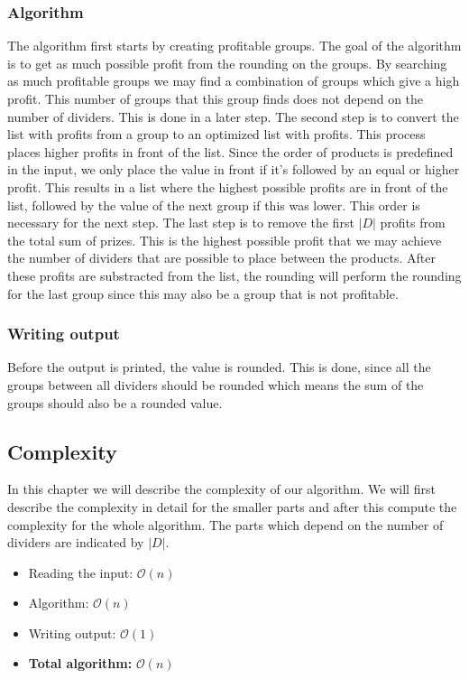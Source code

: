 \documentclass{article}
\newcommand{\bigO}[1]{\mathcal{O}(#1)}
\begin{document}
\subsubsection{Algorithm}
The algorithm first starts by creating profitable groups. The goal of the algorithm is to get as much possible profit from the rounding on the groups. By searching as much profitable groups we may find a combination of groups which give a high profit. This number of groups that this group finds does not depend on the number of dividers. This is done in a later step.
\newline
\newline
The second step is to convert the list with profits from a group to an optimized list with profits. This process places higher profits in front of the list. Since the order of products is predefined in the input, we only place the value in front if it's followed by an equal or higher profit. This results in a list where the highest possible profits are in front of the list, followed by the value of the next group if this was lower. This order is necessary for the next step.
\newline
\newline
The last step is to remove the first $|D|$ profits from the total sum of prizes. This is the highest possible profit that we may achieve the number of dividers that are possible to place between the products. After these profits are substracted from the list, the rounding will perform the rounding for the last group since this may also be a group that is not profitable.

\subsubsection{Writing output}
Before the output is printed, the value is rounded. This is done, since all the groups between all dividers should be rounded which means the sum of the groups should also be a rounded value.

\subsection{Complexity}
In this chapter we will describe the complexity of our algorithm. We will first describe the complexity in detail for the smaller parts and after this compute the complexity for the whole algorithm. The parts which depend on the number of dividers are indicated by $|D|$.

\begin{itemize}
  \item Reading the input: $\bigO{n}$
  \item Algorithm: $\bigO{n}$
  \item Writing output: $\bigO{1}$
  \item \textbf{Total algorithm:} $\bigO{n}$
\end{itemize}
\end{document}

